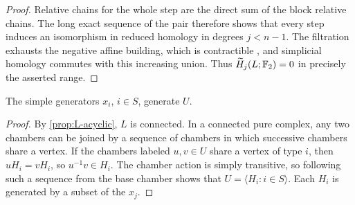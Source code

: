 \begin{proof}
Relative chains for the whole step are the direct sum of the block
relative chains. The long exact sequence of the pair therefore shows
that every step induces an isomorphism in reduced homology in degrees
$j<n-1$. The filtration exhausts the negative affine building, which is
contractible \cite[Theorem~II.10A.4 and Remark~II.10A.6]{BH1999},
and simplicial homology commutes with this increasing union. Thus
$\widetilde H_j(L;\mathbb F_2)=0$ in precisely the asserted range.
\end{proof}

\begin{corollary}\label{cor:generation}
The simple generators $x_i$, $i\in S$, generate $U$.
\end{corollary}

\begin{proof}
By \cref{prop:L-acyclic}, $L$ is connected. In a connected pure complex,
any two chambers can be joined by a sequence of chambers in which
successive chambers share a vertex. If the chambers labeled $u,v\in U$
share a vertex of type $i$, then $uH_i=vH_i$, so $u^{-1}v\in H_i$.
The chamber action is simply transitive, so following such a sequence
from the base chamber shows that $U=\langle H_i:i\in S\rangle$.
Each $H_i$ is generated by a subset of the $x_j$.
\end{proof}
